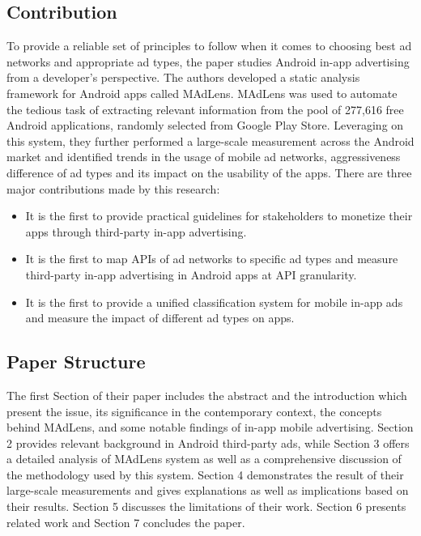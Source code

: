 \documentclass[conference]{IEEEtran}
\begin{document}
\subsection{Contribution}
To provide a reliable set of principles to follow when it comes to choosing best ad networks and appropriate ad types, the paper studies Android in-app advertising from a developer’s perspective. The authors developed a static analysis framework for Android apps called MAdLens. MAdLens was used to automate the tedious task of extracting relevant information from the pool of 277,616 free Android applications, randomly selected from Google Play Store. Leveraging on this system, they further performed a large-scale measurement across the Android market and identified trends in the usage of mobile ad networks, aggressiveness difference of ad types and its impact on the usability of the apps. There are three major contributions made by this research:
\begin{itemize}
\item It is the first to provide practical guidelines for stakeholders to monetize their apps through third-party in-app advertising.
\item It is the first to map APIs of ad networks to specific ad types and measure third-party in-app advertising in Android apps at API granularity.
\item It is the first to provide a unified classification system for mobile in-app ads and measure the impact of different ad types on apps.
\end{itemize}

\subsection{Paper Structure}
The first Section of their paper includes the abstract and the introduction which present the issue, its significance in the contemporary context, the concepts behind MAdLens, and some notable findings of in-app mobile advertising. Section 2 provides relevant background in Android third-party ads, while Section 3 offers a detailed analysis of MAdLens system as well as a comprehensive discussion of the methodology used by this system. Section 4 demonstrates the result of their large-scale measurements and gives explanations as well as implications based on their results. Section 5 discusses the limitations of their work. Section 6 presents related work and Section 7 concludes the paper.
\end{document}
